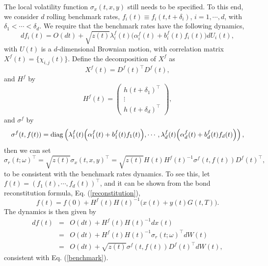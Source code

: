 \documentclass[12pt]{article}
\begin{document}
    The local volatility function $\sigma_x(t,x,y)$ still needs to be specified.
    To this end, we consider $d$ rolling benchmark rates, $f_i(t)\equiv f_i(t,t+\delta_i)$, $i=1,\cdots,d$, with
    $\delta_1<\cdots<\delta_d$. We require that the benchmark rates have the following dynamics,
    \begin{equation}
      df_i(t)=O(dt)+\sqrt{z(t)}\lambda_i^f(t)\Big(\alpha_i^f(t)+b_i^f(t)f_i(t)\Big)dU_i(t),
      \label{benchmark}
    \end{equation}
    with $U(t)$ is a $d$-dimensional Brownian motion, with correlation matrix $X^f(t)=\{\chi_{i,j}(t)\}$. Define the decomposition
    of $X^f$ as
    \begin{equation}
      X^f(t)=D^f(t)^{\top}D^f(t),
    \end{equation}
    and $H^f$ by
    \begin{equation}
      H^f(t)=\left(
                \begin{array}{c}
                  h(t+\delta_1)^{\top}\\
                  \vdots\\
                  h(t+\delta_d)^{\top}
                \end{array}
              \right),
    \end{equation}
    and $\sigma^f$ by
    \begin{equation}
      \sigma^f(t,f(t))={\rm diag}\left(
                \lambda_1^f(t)\Big(\alpha_1^f(t)+b_1^f(t)f_1(t)\Big),
                \cdots,
                \lambda_d^f(t)\Big(\alpha_d^f(t)+b_d^f(t)f_d(t)\Big)
              \right),
    \end{equation}
    then we can set
    \begin{equation}
      \sigma_r(t;\omega)^{\top}=\sqrt{z(t)}\sigma_x(t,x,y)^{\top}
                =\sqrt{z(t)}H(t)H^f(t)^{-1}\sigma^f(t,f(t))D^f(t)^{\top},
    \end{equation}
    to be consistent with the benchmark rates dynamics. To see this, let $f(t)=(f_1(t),\cdots,f_d(t))^{\top}$,
    and it can be shown from the bond reconstitution formula, Eq. (\ref{reconstitution}),
    \begin{equation}
      f(t)=f(0)+H^f(t)H(t)^{-1}\Big(x(t)+y(t)G(t,T)\Big).
    \end{equation}
    The dynamics is then given by
    \begin{eqnarray}
      df(t) &=& O(dt)+H^f(t)H(t)^{-1}dx(t)\nonumber\\
            &=& O(dt)+H^f(t)H(t)^{-1}\sigma_r(t;\omega)^{\top}dW(t)\nonumber\\
            &=& O(dt)+\sqrt{z(t)}\sigma^f(t,f(t))D^f(t)^{\top}dW(t),
    \end{eqnarray}
    consistent with Eq. (\ref{benchmark}).
\end{document}
